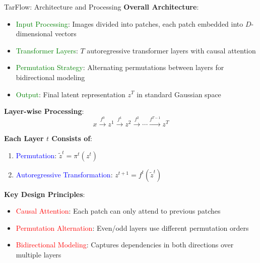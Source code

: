 \documentclass[aspectratio=169]{beamer}
\begin{document}
\begin{frame}{TarFlow: Architecture and Processing}
\textbf{Overall Architecture}:
\begin{itemize}
    \item \textcolor{green}{Input Processing}: Images divided into patches, each patch embedded into $D$-dimensional vectors
    \item \textcolor{green}{Transformer Layers}: $T$ autoregressive transformer layers with causal attention
    \item \textcolor{green}{Permutation Strategy}: Alternating permutations between layers for bidirectional modeling
    \item \textcolor{green}{Output}: Final latent representation $z^T$ in standard Gaussian space
\end{itemize}

\textbf{Layer-wise Processing}:
\begin{equation}
    x \xrightarrow{f^0} z^1 \xrightarrow{f^1} z^2 \xrightarrow{f^2} \cdots \xrightarrow{f^{T-1}} z^T
\end{equation}

\textbf{Each Layer $t$ Consists of}:
\begin{enumerate}
    \item \textcolor{blue}{Permutation}: $\tilde{z}^t = \pi^t(z^t)$
    \item \textcolor{blue}{Autoregressive Transformation}: $z^{t+1} = f^t(\tilde{z}^t)$
\end{enumerate}

\textbf{Key Design Principles}:
\begin{itemize}
    \item \textcolor{red}{Causal Attention}: Each patch can only attend to previous patches
    \item \textcolor{red}{Permutation Alternation}: Even/odd layers use different permutation orders
    \item \textcolor{red}{Bidirectional Modeling}: Captures dependencies in both directions over multiple layers
\end{itemize}
\end{frame}
\end{document}
